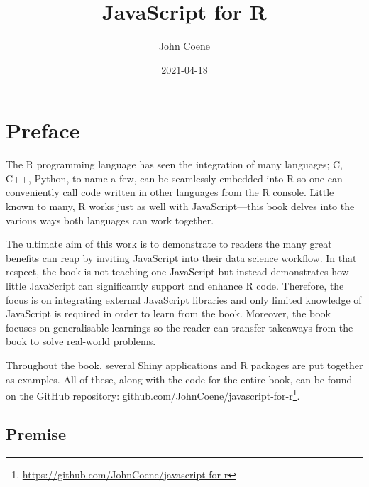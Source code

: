 \documentclass[10pt,]{krantz}
\title{JavaScript for R}
\author{John Coene}
\date{2021-04-18}
\renewcommand{\href}[2]{#2\footnote{\url{#1}}}
\begin{document}
\maketitle


\thispagestyle{empty}

\begin{center}
\end{center}

\setlength{\abovedisplayskip}{-5pt}
\setlength{\abovedisplayshortskip}{-5pt}

{
\hypersetup{linkcolor=}
\setcounter{tocdepth}{2}
\tableofcontents
}
\listoffigures
\hypertarget{preface}{%
\chapter*{Preface}\label{preface}}


The R programming language has seen the integration of many languages; C, C++, Python, to name a few, can be seamlessly embedded into R so one can conveniently call code written in other languages from the R console. Little known to many, R works just as well with JavaScript---this book delves into the various ways both languages can work together.

The ultimate aim of this work is to demonstrate to readers the many great benefits can reap by inviting JavaScript into their data science workflow. In that respect, the book is not teaching one JavaScript but instead demonstrates how little JavaScript can significantly support and enhance R code. Therefore, the focus is on integrating external JavaScript libraries and only limited knowledge of JavaScript is required in order to learn from the book. Moreover, the book focuses on generalisable learnings so the reader can transfer takeaways from the book to solve real-world problems.

Throughout the book, several Shiny applications and R packages are put together as examples. All of these, along with the code for the entire book, can be found on the GitHub repository: \href{https://github.com/JohnCoene/javascript-for-r}{github.com/JohnCoene/javascript-for-r}.

\hypertarget{premise}{%
\section*{Premise}\label{premise}}
\end{document}
